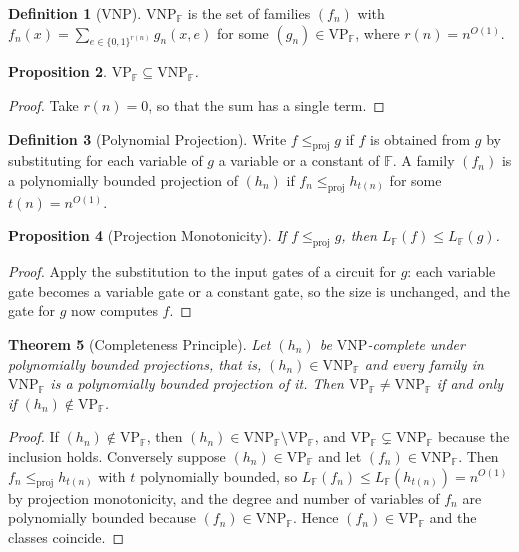 \documentclass[11pt,letterpaper]{report}
\theoremstyle{plain}
\newtheorem{theorem}{Theorem}[chapter]
\newtheorem{proposition}[theorem]{Proposition}
\theoremstyle{definition}
\newtheorem{definition}[theorem]{Definition}
\theoremstyle{remark}
\newcommand{\VP}{\mathrm{VP}}
\newcommand{\VNP}{\mathrm{VNP}}
\begin{document}
\begin{definition}[VNP]
$\VNP_{\mathbb F}$ is the set of families $(f_n)$ with $f_n(x)=\sum_{e\in\{0,1\}^{r(n)}}g_n(x,e)$ for some $(g_n)\in\VP_{\mathbb F}$, where $r(n)=n^{O(1)}$.
\end{definition}

\begin{proposition}
$\VP_{\mathbb F}\subseteq\VNP_{\mathbb F}$.
\end{proposition}
\begin{proof}
Take $r(n)=0$, so that the sum has a single term.
\end{proof}

\begin{definition}[Polynomial Projection]
Write $f\le_{\mathrm{proj}}g$ if $f$ is obtained from $g$ by substituting for each variable of $g$ a variable or a constant of $\mathbb F$. A family $(f_n)$ is a polynomially bounded projection of $(h_n)$ if $f_n\le_{\mathrm{proj}}h_{t(n)}$ for some $t(n)=n^{O(1)}$.
\end{definition}

\begin{proposition}[Projection Monotonicity]
If $f\le_{\mathrm{proj}}g$, then $L_{\mathbb F}(f)\le L_{\mathbb F}(g)$.
\end{proposition}
\begin{proof}
Apply the substitution to the input gates of a circuit for $g$: each variable gate becomes a variable gate or a constant gate, so the size is unchanged, and the gate for $g$ now computes $f$.
\end{proof}

\begin{theorem}[Completeness Principle]\label{th:completeness}
Let $(h_n)$ be $\VNP$-complete under polynomially bounded projections, that is, $(h_n)\in\VNP_{\mathbb F}$ and every family in $\VNP_{\mathbb F}$ is a polynomially bounded projection of it. Then $\VP_{\mathbb F}\ne\VNP_{\mathbb F}$ if and only if $(h_n)\notin\VP_{\mathbb F}$.
\end{theorem}
\begin{proof}
If $(h_n)\notin\VP_{\mathbb F}$, then $(h_n)\in\VNP_{\mathbb F}\setminus\VP_{\mathbb F}$, and $\VP_{\mathbb F}\subsetneq\VNP_{\mathbb F}$ because the inclusion holds. Conversely suppose $(h_n)\in\VP_{\mathbb F}$ and let $(f_n)\in\VNP_{\mathbb F}$. Then $f_n\le_{\mathrm{proj}}h_{t(n)}$ with $t$ polynomially bounded, so $L_{\mathbb F}(f_n)\le L_{\mathbb F}(h_{t(n)})=n^{O(1)}$ by projection monotonicity, and the degree and number of variables of $f_n$ are polynomially bounded because $(f_n)\in\VNP_{\mathbb F}$. Hence $(f_n)\in\VP_{\mathbb F}$ and the classes coincide.
\end{proof}
\end{document}
